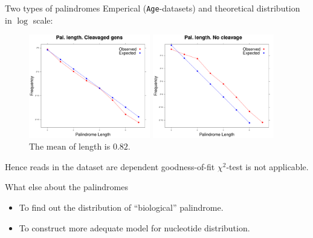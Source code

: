 \documentclass{beamer}\usepackage[]{graphicx}\usepackage[]{color}
\begin{document}
\begin{frame}{Two types of palindromes}
 Emperical (\texttt{Age}-datasets) and theoretical distribution in $\log$ scale:
 \begin{figure}[h]
  \begin{minipage}[h]{0.49\linewidth}
    \center\includegraphics[width=150pt]{distr_pal_len_cl.pdf}
    \caption{\footnotesize{The $\mathrm{mean}$  of length is $0.33$.}}
  \end{minipage}
  \hfill
  \begin{minipage}[h]{0.49\linewidth}
   \includegraphics[width=150pt]{distr_pal_len_nocl.pdf}
   \caption{\footnotesize{The $\mathrm{mean}$ of length is $0.82$.}} 
  \end{minipage}
 \end{figure}
 
 \pause
 {\color{blue} Hence reads in the dataset are dependent goodness-of-fit $\chi^2$-test is not applicable. }
\end{frame}


\begin{frame}{What else about the palindromes}
  \begin{itemize}
    \item To find out the distribution of ``biological'' palindrome.
    \item To construct more adequate model for nucleotide distribution.
  \end{itemize}
\end{frame}
\end{document}
